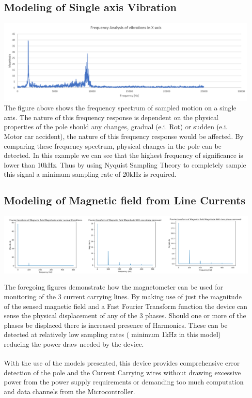 \documentclass[12pt]{article}
\begin{document}
\subsection{Modeling of Single axis Vibration}
\includegraphics[scale = 0.5]{XaxisVibrations.PNG} 
\\The figure above shows the frequency spectrum of sampled motion on  a single axis. The nature of this frequency response is dependent on the physical properties of the pole should any changes, gradual (e.i. Rot) or sudden (e.i. Motor car accident), the nature of this frequency response would be affected. By comparing these frequency spectrum, physical changes in the pole can be detected. In this example we can see that the highest frequency of significance is lower than 10kHz. Thus by using Nyquist Sampling Theory to completely sample this signal a minimum sampling rate of 20kHz is required. 


\subsection[]{Modeling of Magnetic field from Line Currents}
\includegraphics[scale = 0.45]{MagneticFFT.PNG}

The foregoing figures demonstrate how the magnetometer can be used for monitoring of the 3 current carrying lines. By making use of just the magnitude of the sensed magnetic field and a Fast Fourier Transform function the device can sense the physical displacement of any of the 3 phases. Should one or more of the phases be displaced there is  increased presence of Harmonics. These can be detected at relatively low sampling rates ( minimum 1kHz in this model) reducing the power draw needed by the device. 
\\ 
\\
With the use of the models presented, this device provides comprehensive error detection of the pole and the Current Carrying  wires without drawing excessive power from the power supply requirements or demanding too much computation and data channels  from  the Microcontroller. 
\end{document}

